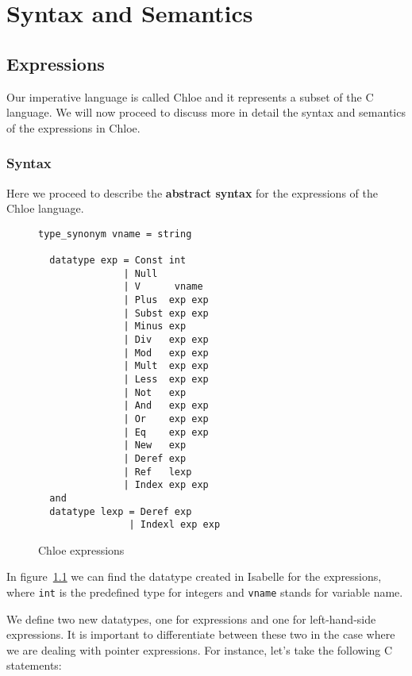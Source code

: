 \chapter{Syntax and Semantics}\label{chapter:semantics}

\section{Expressions}\label{section:expressions}

Our imperative language is called Chloe and it represents a subset of the C language.
We will now proceed to discuss more in detail the syntax and semantics of the expressions in Chloe.

\subsection{Syntax}\label{subsection:syntax_expressions}

Here we proceed to describe the \textbf{abstract syntax} for the expressions of the Chloe language.

\begin{figure}
  \begin{lstlisting}[frame=single]
  type_synonym vname = string

  datatype exp = Const int
               | Null
               | V      vname
               | Plus  exp exp
               | Subst exp exp
               | Minus exp
               | Div   exp exp
               | Mod   exp exp
               | Mult  exp exp
               | Less  exp exp
               | Not   exp
               | And   exp exp
               | Or    exp exp
               | Eq    exp exp
               | New   exp
               | Deref exp
               | Ref   lexp
               | Index exp exp
  and
  datatype lexp = Deref exp
                | Indexl exp exp
  \end{lstlisting}

  \caption{Chloe expressions}
  \label{fig:chloe_expressions}
\end{figure}

In figure~\ref{fig:chloe_expressions} we can find the datatype created in Isabelle for the expressions, where \verb|int| is the predefined type for integers and \verb|vname| stands for variable name.

We define two new datatypes, one for expressions and one for left-hand-side expressions.
It is important to differentiate between these two in the case where we are dealing with pointer expressions.
For instance, let's take the following C statements:

